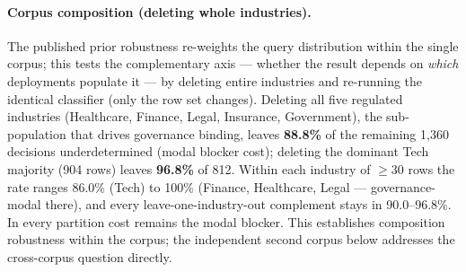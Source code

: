 \documentclass{article} %
\begin{document}
\paragraph{Corpus composition (deleting whole industries).}
The published prior robustness re-weights the query distribution within the single corpus; this tests the complementary axis --- whether the result depends on \emph{which} deployments populate it --- by deleting entire industries and re-running the identical classifier (only the row set changes). Deleting all five regulated industries (Healthcare, Finance, Legal, Insurance, Government), the sub-population that drives governance binding, leaves \textbf{88.8\%} of the remaining 1{,}360 decisions underdetermined (modal blocker cost); deleting the dominant Tech majority (904 rows) leaves \textbf{96.8\%} of 812. Within each industry of $\ge 30$ rows the rate ranges 86.0\% (Tech) to 100\% (Finance, Healthcare, Legal --- governance-modal there), and every leave-one-industry-out complement stays in 90.0--96.8\%. In every partition cost remains the modal blocker. This establishes composition robustness within the corpus; the independent second corpus below addresses the cross-corpus question directly.
\end{document}

